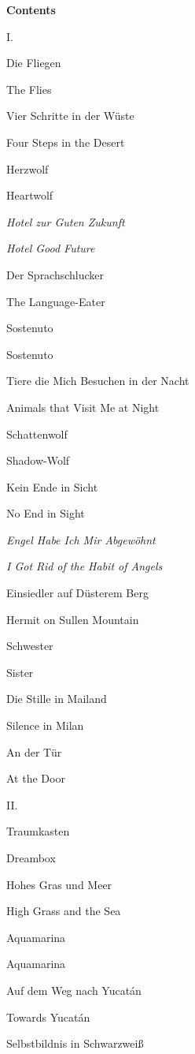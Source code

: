 \documentclass[a4paper]{article}
\begin{document}
\clearpage
\bigskip

{\bfseries
Contents}


\bigskip

I.


\bigskip

Die Fliegen

The Flies

Vier Schritte in der Wüste

Four Steps in the Desert

Herzwolf

Heartwolf

{\itshape
Hotel zur Guten Zukunft}

{\itshape
Hotel Good Future}

Der Sprachschlucker

The Language-Eater

Sostenuto 

Sostenuto

Tiere die Mich Besuchen in der Nacht

Animals that Visit Me at Night

Schattenwolf

Shadow-Wolf

Kein Ende in Sicht

No End in Sight

{\itshape
Engel Habe Ich Mir Abgewöhnt}

{\itshape
I Got Rid of the Habit of Angels}

Einsiedler auf Düsterem Berg

Hermit on Sullen Mountain

Schwester 

Sister

Die Stille in Mailand

Silence in Milan

An der Tür

At the Door


\bigskip

II.


\bigskip

Traumkasten

Dreambox

Hohes Gras und Meer

High Grass and the Sea

Aquamarina

Aquamarina

Auf dem Weg nach Yucatán

Towards Yucatán

Selbstbildnis in Schwarzweiß
\end{document}
